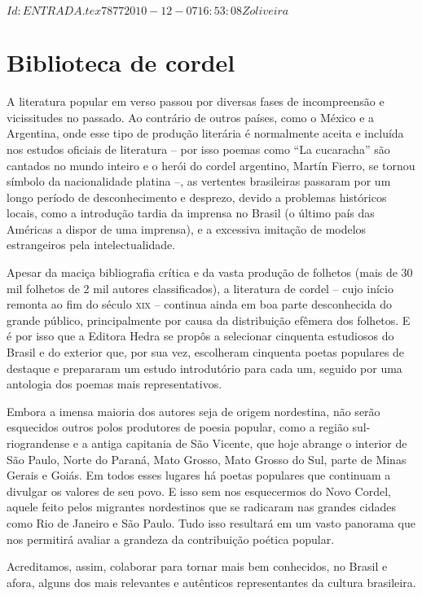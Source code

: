 \SVN $Id: ENTRADA.tex 7877 2010-12-07 16:53:08Z oliveira $

\vspace*{.15\textheight}

\section{Biblioteca de cordel}


A literatura popular em verso passou por diversas fases de incompreensão e
vicissitudes no passado. Ao contrário de outros países, como o México e a
Argentina, onde esse tipo de produção literária é normalmente aceita e incluída
nos estudos oficiais de literatura -- por isso poemas como ``La cucaracha'' são
cantados no mundo inteiro e o herói do cordel argentino, Martín Fierro, se
tornou símbolo da nacionalidade platina \mbox{--,} as vertentes brasileiras passaram por
um longo período de desconhecimento e desprezo, devido a problemas históricos
locais, como a introdução tardia da imprensa no Brasil (o último país das
Américas a dispor de uma imprensa), e a excessiva imitação de modelos
estrangeiros pela intelectualidade. 

Apesar da maciça bibliografia crítica e da vasta produção de folhetos (mais de
30 mil folhetos de 2 mil autores classificados), a literatura de cordel -- cujo
início remonta ao fim do século \textsc{xix} -- continua ainda em boa parte desconhecida
do grande público, principalmente por causa da distribuição efêmera dos
folhetos. E é por isso que a Editora Hedra se propôs a selecionar cinquenta
estudiosos do Brasil e do exterior que, por sua vez, escolheram cinquenta poetas
populares de destaque e prepararam um estudo introdutório para cada um, seguido
por uma antologia dos poemas mais representativos. 

Embora a imensa maioria dos autores seja de origem nordestina, não serão
esquecidos outros polos produtores de poesia popular, como a região
sul-riograndense e a antiga capitania de São Vicente, que hoje abrange o
interior de São Paulo, Norte do Paraná, Mato Grosso, Mato Grosso do Sul, parte
de Minas Gerais e Goiás. Em todos esses lugares há poetas populares que
continuam a divulgar os valores de seu povo. E isso sem nos esquecermos do Novo
Cordel, aquele feito pelos migrantes nordestinos que se radicaram nas grandes
cidades como Rio de Janeiro e São Paulo. Tudo isso resultará em um vasto
panorama que nos permitirá avaliar a grandeza da contribuição poética popular. 

Acreditamos, assim, colaborar para tornar mais bem conhecidos, no Brasil e afora,
alguns dos mais relevantes e autênticos representantes da cultura brasileira. 

